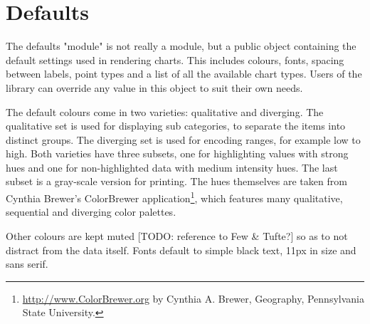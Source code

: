 \section{Defaults}
The defaults "module" is not really a module, but a public object containing the default settings used in rendering charts. This includes colours, fonts, spacing between labels, point types and a list of all the available chart types. Users of the library can override any value in this object to suit their own needs.

The default colours come in two varieties: qualitative and diverging\cite{few08}. The qualitative set is used for displaying sub categories, to separate the items into distinct groups. The diverging set is used for encoding ranges, for example low to high. Both varieties have three subsets, one for highlighting values with strong hues and one for non-highlighted data with medium intensity hues. The last subset is a gray-scale version for printing. The hues themselves are taken from Cynthia Brewer's ColorBrewer application\footnote{\url{http://www.ColorBrewer.org} by Cynthia A. Brewer, Geography, Pennsylvania State University.}, which features many qualitative, sequential and diverging color palettes.

Other colours are kept muted [TODO: reference to Few \& Tufte?] so as to not distract from the data itself. Fonts default to simple black text, 11px in size and sans serif.




